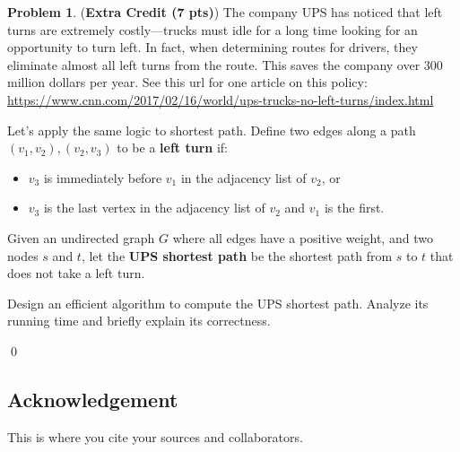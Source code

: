 \documentclass[12pt]{article}
\theoremstyle{definition}
\newtheorem{question}{Problem}
\newenvironment{solution}{\bigskip\noindent{\it Solution.}  \ignorespaces}{\hfill\qed}
\begin{document}
\newpage
\begin{question}({\bf Extra Credit (7 pts)})
  The company UPS has noticed that left turns are extremely costly---trucks must idle for a long time looking for an opportunity to turn left.  In fact, when determining routes for drivers, they eliminate almost all left turns from the route.  This saves the company over 300 million dollars per year.  See this url for one article on this policy: \url{https://www.cnn.com/2017/02/16/world/ups-trucks-no-left-turns/index.html}

  Let's apply the same logic to shortest path.  Define two edges along a path $(v_1,v_2), (v_2, v_3)$ to be a \textbf{left turn} if:
  \begin{itemize}[topsep=0pt,noitemsep]
    \item $v_3$ is immediately before $v_1$ in the adjacency list of $v_2$, or 
    \item $v_3$ is the last vertex in the adjacency list of $v_2$ and $v_1$ is the first.
  \end{itemize}

  Given an undirected graph $G$ where all edges have a positive weight, and two nodes $s$ and $t$, let the \textbf{UPS shortest path} be the shortest path from $s$ to $t$ that does not take a left turn.

  Design an efficient algorithm to compute the {UPS shortest path}.  Analyze its running time and briefly explain its correctness.
\end{question}
\begin{solution}
\end{solution}

\newpage
\subsection*{Acknowledgement}
This is where you cite your sources and collaborators.
\end{document}

